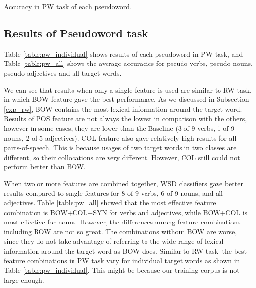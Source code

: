 \documentclass[english]{jnlp_1.4}
\begin{document}
\begin{table}[b]
\vspace*{-0.5\Cvs}
\caption{Accuracy in PW task of each pseudoword.}
\label{table:pw_individual}

\end{table}

\subsection{Results of Pseudoword task}
\label{exp_pw}

Table \ref{table:pw_individual} shows results of each pseudoword in PW task,
\pagebreak
and Table \ref{table:pw_all} shows the average accuracies for pseudo-verbs, pseudo-nouns, pseudo-adjectives and all target words.

We can see that results when only a single feature is used are similar to RW task,
in which BOW feature gave the best performance.
As we discussed in Subsection \ref{exp_rw},
BOW contains the most lexical information around the target word.
Results of POS feature are not always the lowest in comparison with the others,
however in some cases, they are lower than the Baseline
(3 of 9 verbs, 1 of 9 nouns, 2 of 5 adjectives).
COL feature also gave relatively high results for all parts-of-speech.
This is because usages of two target words in two classes are different, 
so their collocations are very different.
However, COL still could not perform better than BOW. 

\begin{table}[t]
\label{table:pw_all}

\end{table}

When two or more features are combined together, 
WSD classifiers gave better results compared to single features for 
8 of 9 verbs, 6 of 9 nouns, and all adjectives.
Table \ref{table:pw_all} showed that the most effective feature combination is 
BOW+COL+SYN for verbs and adjectives,
while BOW+COL is most effective for nouns.
However, the differences among feature combinations including BOW are not so great.
The combinations without BOW are worse,
since they do not take advantage of referring to the wide range of lexical information around the target word as BOW does.
Similar to RW task, the best feature combinations in PW task vary for individual target words as shown in Table \ref{table:pw_individual}.
This might be because our training corpus is not large enough.
\end{document}
